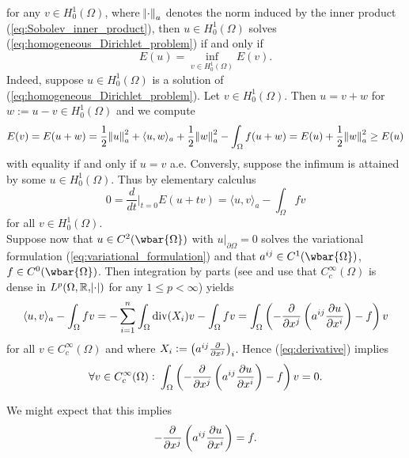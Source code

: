 \noindent for any $v \in H^1_0(\Omega)$, where $\norm{\cdot}_a$ denotes the norm induced by the inner product (\ref{eq:Sobolev_inner_product}), then $u \in H^1_0(\Omega)$ solves (\ref{eq:homogeneous_Dirichlet_problem}) if and only if
\begin{equation}
	\label{eq:variational_formulation}
	E(u) = \inf_{v \in H^1_0(\Omega)}E(v).
\end{equation}
Indeed, suppose $u \in H^1_0(\Omega)$ is a solution of (\ref{eq:homogeneous_Dirichlet_problem}). Let $v \in H^1_0(\Omega)$. Then $u = v + w$ for $w := u - v \in H^1_0(\Omega)$ and we compute
\begin{equation*}
	E(v) = E(u + w) = \frac{1}{2}\norm{u}^2_a + \langle u,w \rangle_a + \frac{1}{2}\norm{w}^2_a - \int_\Omega f(u + w) = E(u) + \frac{1}{2}\norm{w}^2_a \geq E(u)
\end{equation*}
\noindent with equality if and only if $u = v$ a.e. Conversly, suppose the infimum is attained by some $u \in H^1_0(\Omega)$. Thus by elementary calculus
\begin{equation}
	\label{eq:derivative}
	0 = \frac{d}{dt}\bigg\vert_{t = 0} E(u + tv) = \langle u, v \rangle_a - \int_\Omega f v
\end{equation}
\noindent for all $v \in H^1_0(\Omega)$.\\
Suppose now that $u \in C^2(\wbar{\Omega})$ with $u\vert_{\partial \Omega} = 0$ solves the variational formulation (\ref{eq:variational_formulation}) and that $a^{ij} \in C^1(\wbar{\Omega})$, $f \in C^0(\wbar{\Omega})$. Then integration by parts (see \cite[436]{lee:smooth_manifolds:2013} and use that $C^\infty_c(\Omega)$ is dense in $L^p(\Omega,\mathbb{R},\abs{\cdot})$ for any $1 \leq p < \infty$) yields
\begin{equation*}
	\langle u, v \rangle_a - \int_\Omega f v = -\sum_{i = 1}^n \int_\Omega \mathrm{div}(X_i) v - \int_\Omega fv = \int_\Omega \del[3]{-\frac{\partial}{\partial x^j}\del[3]{a^{ij}\frac{\partial u}{\partial x^i}} - f} v
\end{equation*}
\noindent for all $v \in C^\infty_c(\Omega)$ and where $X_i := \del[1]{a^{ij}\frac{\partial}{\partial x^j}}_i$. Hence (\ref{eq:derivative}) implies 
\begin{equation*}
	\forall v \in C^\infty_c(\Omega): \> \int_\Omega \del[3]{-\frac{\partial}{\partial x^j}\del[3]{a^{ij}\frac{\partial u}{\partial x^i}} - f} v = 0.
\end{equation*}

We might expect that this implies 
\begin{equation*}
	-\frac{\partial}{\partial x^j}\del[3]{a^{ij}\frac{\partial u}{\partial x^i}} = f.
\end{equation*}

